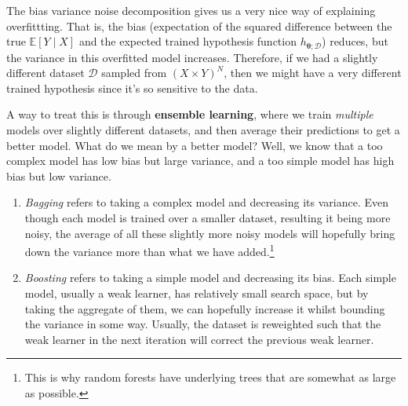 The bias variance noise decomposition gives us a very nice way of explaining overfittting. That is, the bias (expectation of the squared difference between the true $\mathbb{E}[Y \mid X]$ and the expected trained hypothesis function $h_{\boldsymbol{\theta}; \mathcal{D}}$) reduces, but the variance in this overfitted model increases. Therefore, if we had a slightly different dataset $\mathcal{D}$ sampled from $(X \times Y)^N$, then we might have a very different trained hypothesis since it's so sensitive to the data. 

A way to treat this is through \textbf{ensemble learning}, where we train \textit{multiple} models over slightly different datasets, and then average their predictions to get a better model. What do we mean by a better model? Well, we know that a too complex model has low bias but large variance, and a too simple model has high bias but low variance. 

\begin{enumerate}
  \item \textit{Bagging} refers to taking a complex model and decreasing its variance. Even though each model is trained over a smaller dataset, resulting it being more noisy, the average of all these slightly more noisy models will hopefully bring down the variance more than what we have added.\footnote{This is why random forests have underlying trees that are somewhat as large as possible.} 
  \item \textit{Boosting} refers to taking a simple model and decreasing its bias. Each simple model, usually a weak learner, has relatively small search space, but by taking the aggregate of them, we can hopefully increase it whilst bounding the variance in some way. Usually, the dataset is reweighted such that the weak learner in the next iteration will correct the previous weak learner. 
\end{enumerate}

